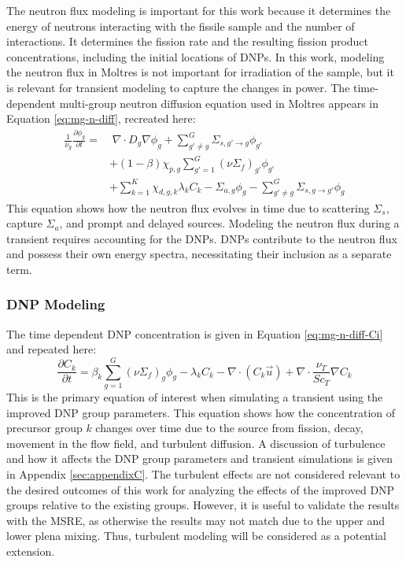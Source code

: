 The neutron flux modeling is important for this work because it determines the energy of neutrons interacting with the fissile sample and the number of interactions.
It determines the fission rate and the resulting fission product concentrations, including the initial locations of \glspl{DNP}.
In this work, modeling the neutron flux in Moltres is not important for irradiation of the sample, but it is relevant for transient modeling to capture the changes in power.
The time-dependent multi-group neutron diffusion equation used in Moltres appears in Equation \eqref{eq:mg-n-diff}, recreated here:
\begin{equation}
    \begin{split}
    \frac{1}{\nu_g} \frac{\partial \phi_g}{\partial t} = & \; \nabla \cdot D_g \nabla \phi_g + \sum_{g' \neq g}^G \Sigma_{s, g' \rightarrow g} \phi_{g'} \\
    & + (1-\beta) \chi_{p, g} \sum_{g'=1}^{G} (\nu \Sigma_f)_{g'} \phi_{g'}\\
    & + \sum_{k=1}^K \chi_{d, g, k} \lambda_k C_k - \Sigma_{a, g} \phi_g - \sum_{g' \neq g}^G \Sigma_{s, g \rightarrow g'} \phi_{g}
    \nonumber
    \end{split}
\end{equation}
This equation shows how the neutron flux evolves in time due to scattering $\Sigma_s$, capture $\Sigma_a$, and prompt and delayed sources.
Modeling the neutron flux during a transient requires accounting for the \glspl{DNP}.
\glspl{DNP} contribute to the neutron flux and possess their own energy spectra, necessitating their inclusion as a separate term.

\subsubsection{\gls{DNP} Modeling}

The time dependent \gls{DNP} concentration is given in Equation \eqref{eq:mg-n-diff-Ci} and repeated here:
\begin{equation}
    \frac{\partial C_k}{\partial t} = \beta_k \sum_{g=1}^G (\nu \Sigma_f)_g \phi_g - \lambda_k C_k - \nabla \cdot (C_k \vec{u}) + \nabla \cdot \frac{\nu_T}{Sc_T} \nabla C_k
    \nonumber
\end{equation}
This is the primary equation of interest when simulating a transient using the improved \gls{DNP} group parameters.
This equation shows how the concentration of precursor group $k$ changes over time due to the source from fission, decay, movement in the flow field, and turbulent diffusion.
A discussion of turbulence and how it affects the \gls{DNP} group parameters and transient simulations is given in Appendix \ref{sec:appendixC}.
The turbulent effects are not considered relevant to the desired outcomes of this work for analyzing the effects of the improved \gls{DNP} groups relative to the existing groups.
However, it is useful to validate the results with the \gls{MSRE}, as otherwise the results may not match due to the upper and lower plena mixing.
Thus, turbulent modeling will be considered as a potential extension.

